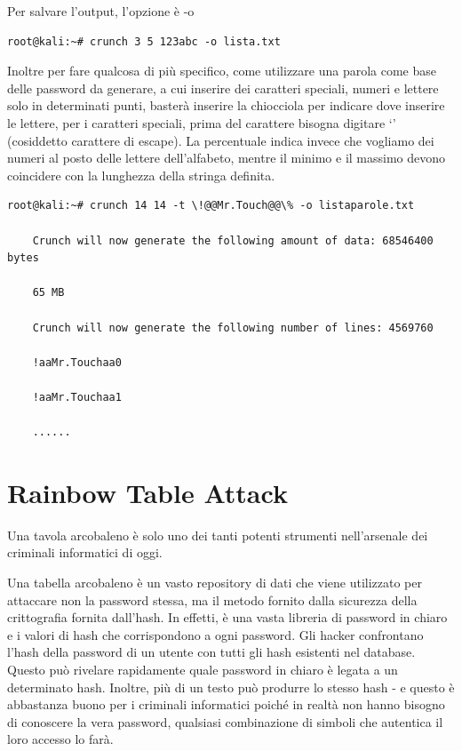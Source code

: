 Per salvare l’output, l’opzione è -o
\begin{lstlisting}[caption={Esempio crunch command}, style=javaScriptCode]
root@kali:~# crunch 3 5 123abc -o lista.txt
\end{lstlisting}
Inoltre per fare qualcosa di più specifico, come utilizzare una parola come base delle password da generare, a cui inserire dei caratteri speciali, numeri e lettere solo in determinati punti, basterà inserire la chiocciola per indicare dove inserire le lettere, per i caratteri speciali, prima del carattere bisogna digitare ‘’ (cosiddetto carattere di escape). La percentuale indica invece che vogliamo dei numeri al posto delle lettere dell’alfabeto, mentre il minimo e il massimo devono coincidere con la lunghezza della stringa definita.
\begin{lstlisting}[caption={Esempio crunch command}, style=javaScriptCode]
root@kali:~# crunch 14 14 -t \!@@Mr.Touch@@\% -o listaparole.txt

    Crunch will now generate the following amount of data: 68546400 bytes

    65 MB

    Crunch will now generate the following number of lines: 4569760

    !aaMr.Touchaa0

    !aaMr.Touchaa1

    ......
\end{lstlisting}
\section{Rainbow Table Attack}
Una tavola arcobaleno \cite{Rainbow_table_attack} è solo uno dei tanti potenti strumenti nell'arsenale dei criminali informatici di oggi.

Una tabella arcobaleno è un vasto repository di dati che viene utilizzato per attaccare non la password stessa, ma il metodo fornito dalla sicurezza della crittografia fornita dall'hash. In effetti, è una vasta libreria di password in chiaro e i valori di hash che corrispondono a ogni password. Gli hacker confrontano l'hash della password di un utente con tutti gli hash esistenti nel database. Questo può rivelare rapidamente quale password in chiaro è legata a un determinato hash. Inoltre, più di un testo può produrre lo stesso hash - e questo è abbastanza buono per i criminali informatici poiché in realtà non hanno bisogno di conoscere la vera password, qualsiasi combinazione di simboli che autentica il loro accesso lo farà.

